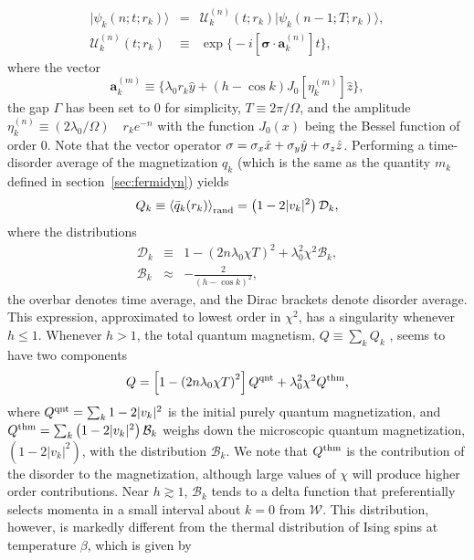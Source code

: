 \documentclass[a4paper,10pt]{report}
\begin{document}
\begin{eqnarray}
\label{eq:rwa:soln}
|\psi_k(n;t;r_k)\rangle &   =  & \mathcal{U}^{(n)}_k\left(t;r_k\right)|\psi_k(n-1;T;r_k)\rangle,\nonumber \\
\mathcal{U}^{(n)}_k\left(t;r_k\right) &\equiv& \exp{\bigg\{-i\left[\bm{\sigma}\cdot{\bm{a}}^{(n)}_k\right] t\bigg\}},
\end{eqnarray}
where the vector 
\begin{equation}
\label{eq:unitvec}
{\bm{a}}^{(m)}_k\equiv \bigg\{\lambda_0 r_k\hat{y}+\left(h-\cos{k}\right)J_0[\eta^{(m)}_k]\hat{z}\bigg\},
\end{equation}
the gap $\Gamma$ has been set to $0$ for simplicity, $T\equiv2\pi/\Omega$, and the amplitude $\eta^{(n)} _k\equiv(2\lambda_0/\Omega)\quad r_ke^{-n}$ with the function $J_0(x)$ being the Bessel function of order $0$. Note that the vector operator ${\bf \sigma}=\sigma_x \hat{x}+\sigma_y\hat{y}+\sigma_z\hat{z}$. Performing a time-disorder average of the magnetization $q_k$ (which is the same as the quantity $m_k$ defined in section~\ref{sec:fermidyn}) yields
\begin{equation}
\label{eq:mag:timerandavg1}
 Q_k\equiv\left\langle \bar{q}_k(r_k)\right\rangle_{\rm rand} = \left(1-2|v_k|^2\right)\mathcal{D}_k,
\end{equation}
where the distributions
\begin{eqnarray}
\label{eq:rwa:distribs}
\mathcal{D}_k &\equiv& 1 - \left(2n\lambda_0\chi T\right)^2 + \lambda^2_0\chi^2\mathcal{B}_k,\nonumber \\
\mathcal{B}_k &\approx& -\frac{2}{(h-\cos{k})^2},
\end{eqnarray}
the overbar denotes time average, and the Dirac brackets denote disorder average. This expression, approximated to lowest order in $\chi^2$,
has a singularity whenever $h\leq 1$. Whenever $h>1$, the total quantum magnetism, $Q\equiv \sum_k Q_k$ , seems to have two components
\begin{equation}
Q = \left[1-\left(2n\lambda_0\chi T\right)^2\right] Q^{\rm qnt}  +\lambda^2_0\chi^2Q^{\rm thm},
\end{equation}
where $Q^{\rm qnt}=\sum_k 1-2|v_k|^2$ is the initial purely quantum magnetization, and $Q^{\rm thm}=\sum_k \left(1-2|v_k|^2\right)\mathcal{B}_k$ weighs down the microscopic quantum magnetization, $\left(1-2|v_k|^2\right)$, with the distribution $\mathcal{B}_k$. We note that $Q^{\rm thm}$ is the contribution of the disorder to the magnetization, although large values of $\chi$ will produce higher order contributions. Near $h\gtrsim 1$, $\mathcal{B}_k$ tends to a delta function that preferentially selects momenta in a small interval about $k=0$ from $\mathcal{W}$. This distribution, however, is markedly different from the thermal distribution of Ising spins at temperature $\beta$, which is given by
\end{document}
